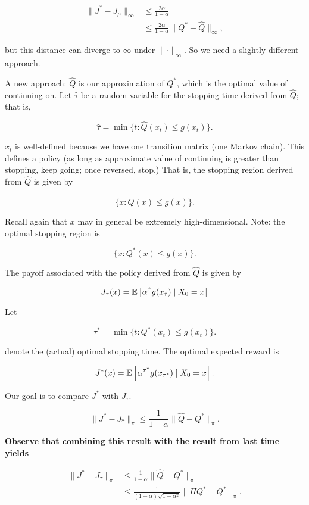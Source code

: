 \begin{align*}
\lVert J^* - J_\mu \rVert_\infty & \leq \frac{2 \alpha}{1-\alpha} 
\\ & \leq \frac{2\alpha}{1-\alpha} \lVert Q^* - \hat{Q} \rVert_\infty,
\end{align*}

but this distance can diverge to \(\infty\) under \(\lVert \cdot \rVert_\infty\). So we need a slightly different approach.

A new approach: \(\hat{Q}\) is our approximation of \(Q^*\), which is the optimal value of continuing on. Let \(\hat{\tau}\) be a random variable for the stopping time derived from \(\hat{Q}\); that is,

\[
\hat{\tau} = \min\{t: \hat{Q}(x_t) \leq g(x_t)\}.
\]

\(x_t\) is well-defined because we have one transition matrix (one Markov chain). This defines a policy (as long as approximate value of continuing is greater than stopping, keep going; once reversed, stop.) That is, the stopping region derived from \(\hat{Q}\) is given by

\[
\{x: \hat{Q}(x) \leq g(x)\}.
\]

Recall again that \(x\) may in general be extremely high-dimensional. Note: the optimal stopping region is 

\[
\{x: Q^*(x) \leq g(x)\}.
\]

The payoff associated with the policy derived from \(\hat{Q}\) is given by

\[
J_{\hat{\tau}}(x) = \mathbb{E} \left[ \alpha^{\hat{\tau}} g(x_{\hat{\tau}}) \mid X_0 = x \right]
\]

Let 

\[
\tau^* = \min\{t: Q^*(x_t) \leq g(x_t)\}.
\]

 denote the (actual) optimal stopping time. The optimal expected reward is
 
 \[
 J^*(x) = \mathbb{E} \left[ \alpha^{\tau^*} g(x_{\tau^*}) \mid X_0 = x \right].
 \]
 
 Our goal is to compare \(J^*\) with \(J_{\hat{\tau}}\). 
 
 \begin{theorem}
 
 \[
 \lVert J^* - J_{\hat{\tau}} \rVert_\pi \leq \frac{1}{1-\alpha} \lVert \hat{Q} - Q^* \rVert_\pi.
 \]
 
 \end{theorem}
 
 \begin{remark}
 
 \textbf{Observe that combining this result with the result from last time yields}
 
  \begin{align*}
 \lVert J^* - J_{\hat{\tau}} \rVert_\pi  & \leq \frac{1}{1-\alpha} \lVert \hat{Q} - Q^* \rVert_\pi
 \\ & \leq \frac{1}{(1-\alpha)\sqrt{1- \alpha^2}} \lVert \Pi Q^* - Q^* \rVert_\pi.
 \end{align*}
 
 \end{remark}
 

